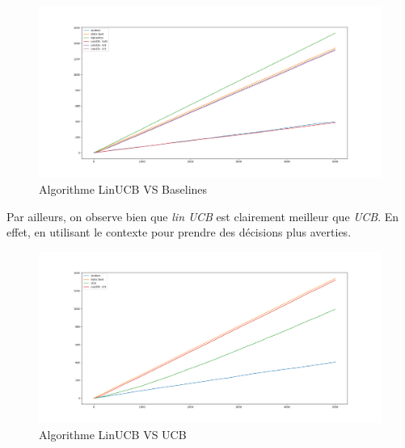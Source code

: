 \documentclass{standalone}
\begin{document}
	\begin{figure}[H]

			\centering
			\includegraphics[scale=0.3]{img/lin_ucb.png}
			\caption{Algorithme LinUCB VS Baselines}

	\end{figure}

Par ailleurs, on observe bien que \emph{lin UCB} est clairement meilleur que \emph{UCB}. En effet, en utilisant le contexte pour prendre des décisions plus averties. 

\begin{figure}[H]
	\centering
	\includegraphics[scale=0.3]{img/linucb_ucb.png}
	\caption{Algorithme LinUCB VS UCB}
\end{figure}


	
\end{document}
